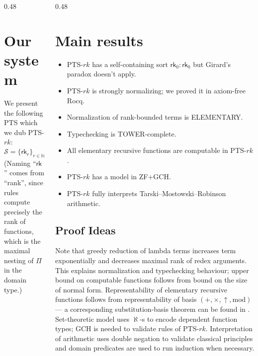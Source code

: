 \documentclass[final]{beamer}
\theoremstyle{remark}
\begin{document}
\begin{frame}[t]
\begin{columns}[t]
\begin{column}{0.48\textwidth}
    \section{Our system}

    We present the following PTS which we dub PTS-$rk$:
    \[
        \mathcal{S}=\{\mathsf{rk}_r\}_{r\in\mathbb{N}}
        \quad
        \mathsf{Ax}=
        \{(\mathsf{rk}_r,\mathsf{rk}_0)
        \}_{r\in\mathbb{N}}
        \quad
        \mathsf{Rule}=
        \{(\mathsf{rk}_r,\mathsf{rk}_s,
        \mathsf{rk}_{(r+1)\vee s})\}_{r,s\in\mathbb{N}}
    \]
    (Naming ``$\mathsf{rk}$'' comes from ``rank'', since
    rules compute precisely the rank of functions, which
    is the maximal nesting of $\Pi$ in the domain type.)
\end{column}

\begin{column}{0.48\textwidth}
    \section{Main results}

    \begin{itemize}
        \item PTS-$rk$ has a self-containing sort
            $\mathsf{rk}_0:\mathsf{rk}_0$ but Girard's
            paradox doesn't apply.
        \item PTS-$rk$ is strongly normalizing; we
            proved it in axiom-free Rocq.
        \item Normalization of rank-bounded terms is
            \textsc{ELEMENTARY}.
        \item Typechecking is \textsc{TOWER}-complete.
        \item All elementary recursive functions are
            computable in PTS-$rk$.
        \item PTS-$rk$ has a model in ZF+GCH.
        \item PTS-$rk$ fully interprets
            Tarski--Mostowski--Robinson arithmetic.
    \end{itemize}

    \subsection{Proof Ideas}

    Note that greedy reduction of lambda terms increases
    term exponentially and decreases maximal rank of
    redex arguments. This explains normalization and
    typechecking behaviour; upper bound on computable
    functions follows from bound on the size of normal
    form. Representability of elementary recursive
    functions follows from representability of basis
    $(+,\times,\uparrow,\mathrm{mod})$ --- a
    corresponding substitution-basis theorem can be
    found in \cite{prunescu2026minimal}. Set-theoretic
    model uses $\aleph$-s to encode dependent function
    types; GCH is needed to validate rules of PTS-$rk$.
    Interpretation of arithmetic uses double negation
    to validate classical principles and domain
    predicates are used to run induction when necessary.


\end{column}
\end{columns}
\end{frame}
\end{document}

